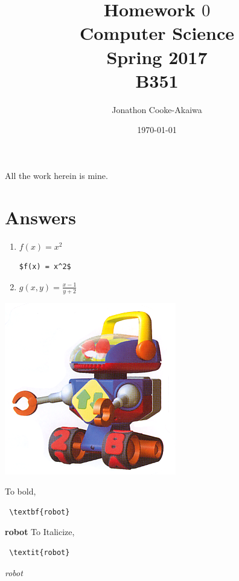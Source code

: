 \documentclass{article}
\begin{document}
\title{Homework $0$\\ Computer Science \\ Spring 2017\\ B351}         %
\author{Jonathon Cooke-Akaiwa}        %
\date{\today}          %
\maketitle


\makeatother     %




\pagestyle{plain}
All the work herein is mine.

\section*{Answers}

\begin{enumerate}
\item $f(x) = x^2$ \begin{verbatim}$f(x) = x^2$\end{verbatim}
\item $g(x,y) = \frac{x - 1}{y + 2}$
\end{enumerate}
\includegraphics[scale=0.5]{robot}

To bold, \begin{verbatim} \textbf{robot} \end{verbatim} \textbf{robot}
To Italicize, \begin{verbatim} \textit{robot} \end{verbatim} \textit{robot}
\end{document}
